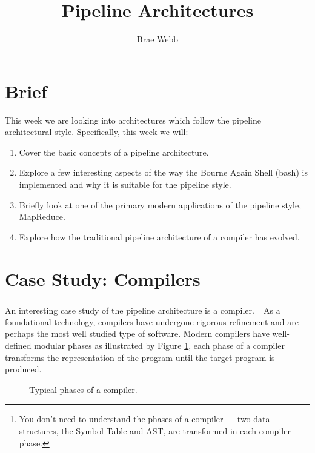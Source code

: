 \documentclass{csse4400}
\title{Pipeline Architectures}
\author{Brae Webb}
\date{\week{2}}
\begin{document}
\maketitle

\section{Brief}
This week we are looking into architectures which
follow the pipeline architectural style.
Specifically, this week we will:
\begin{enumerate}
    \item Cover the basic concepts of a pipeline architecture.
    \item Explore a few interesting aspects of the way the 
        Bourne Again Shell (bash) is implemented and why it is suitable for the 
        pipeline style.
    \item Briefly look at one of the primary modern applications of the pipeline style,
        MapReduce.
    \item Explore how the traditional pipeline architecture of a compiler has evolved.
\end{enumerate}

\section{Case Study: Compilers}

An interesting case study of the pipeline architecture is a compiler.%
\footnote{You don't need to understand the phases of a compiler --- two data structures, the Symbol Table and AST, are transformed in each compiler phase.}
As a foundational technology, compilers have undergone rigorous refinement and are perhaps the most well studied type of software.
Modern compilers have well-defined modular phases as illustrated by Figure \ref{fig:compiler-architecture},
each phase of a compiler transforms the representation of the program until the target program is produced.

\begin{figure}[H]
    \centering
{}
\caption{Typical phases of a compiler.}
\label{fig:compiler-architecture}
\end{figure}
\end{document}
